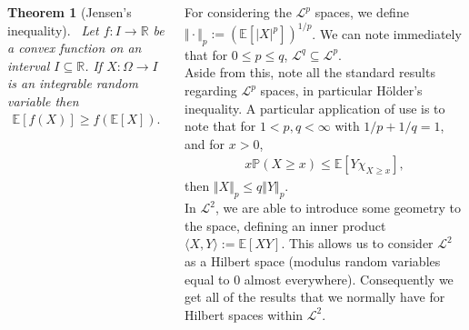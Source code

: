 \documentclass{tikzposter} %
\newtheorem{theorem}{Theorem}
\newtheorem{definition}{Definition}
\begin{document}
\begin{columns}
{{    \begin{theorem}[Jensen's inequality]
      \ Let $f : I \to \mathbb{R}$ be a convex function on an interval $I \subseteq \mathbb{R}$. If $X : \Omega \to I$ is an integrable random variable then
      \begin{align*}
        \mathbb{E}[f(X)] \ge f(\mathbb{E}[X]).
      \end{align*}
    \end{theorem}
    \hphantom{}
    }

    For considering the $\mathcal{L}^{p}$ spaces, we define $\Vert \cdot \Vert_{p} := \left(\mathbb{E}[|X|^{p}]\right)^{1/p}$. We can note immediately that for $0 \le p \le q$, $\mathcal{L}^{q} \subseteq \mathcal{L}^{p}$. \\

    Aside from this, note all the standard results regarding $\mathcal{L}^{p}$ spaces, in particular H\"{o}lder's inequality. A particular application of use is to note that for $1 < p, q < \infty$ with $1/p+1/q = 1$, and for $x > 0$,
    \begin{align*}
      x \mathbb{P}(X \ge x) \le \mathbb{E}[Y \chi_{X \ge x}],
    \end{align*}
    then $\Vert X \Vert_{p} \le q \Vert Y \Vert_{p}$. \\

    In $\mathcal{L}^{2}$, we are able to introduce some geometry to the space, defining an inner product $\langle X, Y \rangle := \mathbb{E}[XY]$. This allows us to consider $\mathcal{L}^{2}$ as a Hilbert space (modulus random variables equal to $0$ almost everywhere). Consequently we get all of the results that we normally have for Hilbert spaces within $\mathcal{L}^{2}$.
  }




\end{columns}
\end{document}
